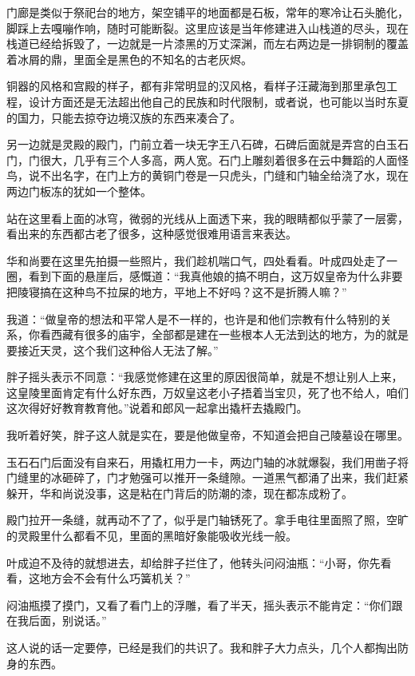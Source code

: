 门廊是类似于祭祀台的地方，架空铺平的地面都是石板，常年的寒冷让石头脆化，脚踩上去嘎嘣作响，随时可能断裂。这里应该是当年修建进入山栈道的尽头，现在栈道已经给拆毁了，一边就是一片漆黑的万丈深渊，而左右两边是一排铜制的覆盖着冰屑的鼎，里面全是黑色的不知名的古老灰烬。

铜器的风格和宫殿的样子，都有非常明显的汉风格，看样子汪藏海到那里承包工程，设计方面还是无法超出他自己的民族和时代限制，或者说，也可能以当时东夏的国力，只能去掠夺边境汉族的东西来凑合了。

另一边就是灵殿的殿门，门前立着一块无字王八石碑，石碑后面就是弄宫的白玉石门，门很大，几乎有三个人多高，两人宽。石门上雕刻着很多在云中舞蹈的人面怪鸟，说不出名字，在门上方的黄铜门卷是一只虎头，门缝和门轴全给浇了水，现在两边门板冻的犹如一个整体。

站在这里看上面的冰穹，微弱的光线从上面透下来，我的眼睛都似乎蒙了一层雾，看出来的东西都古老了很多，这种感觉很难用语言来表达。

华和尚要在这里先拍摄一些照片，我们趁机喘口气，四处看看。叶成四处走了一圈，看到下面的悬崖后，感慨道：“我真他娘的搞不明白，这万奴皇帝为什么非要把陵寝搞在这种鸟不拉屎的地方，平地上不好吗？这不是折腾人嘛？”

我道：“做皇帝的想法和平常人是不一样的，也许是和他们宗教有什么特别的关系，你看西藏有很多的庙宇，全部都是建在一些根本人无法到达的地方，为的就是要接近天灵，这个我们这种俗人无法了解。”

胖子摇头表示不同意：“我感觉修建在这里的原因很简单，就是不想让别人上来，这皇陵里面肯定有什么好东西，万奴皇这老小子捂着当宝贝，死了也不给人，咱们这次得好好教育教育他。”说着和郎风一起拿出撬杆去撬殿门。

我听着好笑，胖子这人就是实在，要是他做皇帝，不知道会把自己陵墓设在哪里。

玉石石门后面没有自来石，用撬杠用力一卡，两边门轴的冰就爆裂，我们用凿子将门缝里的冰砸碎了，门才勉强可以推开一条缝隙。一道黑气都涌了出来，我们赶紧躲开，华和尚说没事，这是粘在门背后的防潮的漆，现在都冻成粉了。

殿门拉开一条缝，就再动不了了，似乎是门轴锈死了。拿手电往里面照了照，空旷的灵殿里什么都看不见，里面的黑暗好象能吸收光线一般。

叶成迫不及待的就想进去，却给胖子拦住了，他转头问闷油瓶：“小哥，你先看看，这地方会不会有什么巧簧机关？”

闷油瓶摸了摸门，又看了看门上的浮雕，看了半天，摇头表示不能肯定：“你们跟在我后面，别说话。”

这人说的话一定要停，已经是我们的共识了。我和胖子大力点头，几个人都掏出防身的东西。

